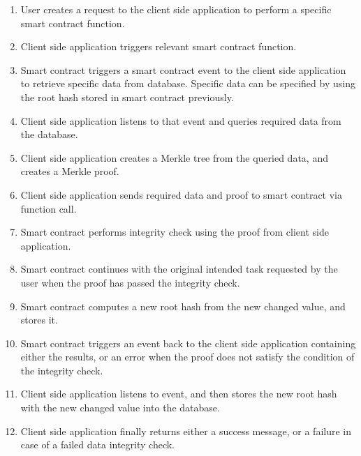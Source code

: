 \begin{enumerate}
\item User creates a request to the client side application to perform a specific smart contract function. 
\item Client side application triggers relevant smart contract function.
\item Smart contract triggers a smart contract event to the client side application to retrieve specific data from database. Specific data can be specified by using the root hash stored in smart contract previously.
\item Client side application listens to that event and queries required data from the database.
\item Client side application creates a Merkle tree from the queried data, and creates a Merkle proof.
\item Client side application sends required data and proof to smart contract via function call.
\item Smart contract performs integrity check using the proof from client side application.
\item Smart contract continues with the original intended task requested by the user when the proof has passed the integrity check. 
\item Smart contract computes a new root hash from the new changed value, and stores it.
\item Smart contract triggers an event back to the client side application containing either the results, or an error when the proof does not satisfy the condition of the integrity check. 
\item Client side application listens to event, and then stores the new root hash with the new changed value into the database. 
\item Client side application finally returns either a success message, or a failure in case of a failed data integrity check. 
\end{enumerate}
